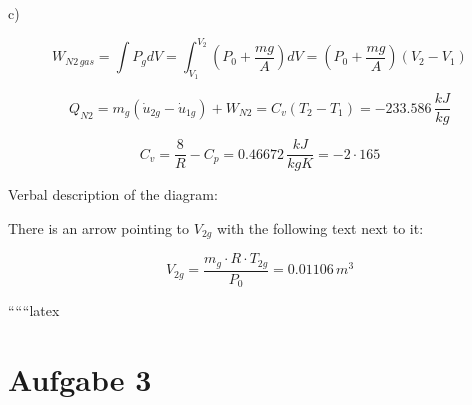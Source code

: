 c) 

\[
W_{N2 \, gas} = \int P_g dV = \int_{V_1}^{V_2} \left( P_0 + \frac{mg}{A} \right) dV = (P_0 + \frac{mg}{A})(V_2 - V_1)
\]

\[
Q_{N2} = m_g (\dot{u}_{2g} - \dot{u}_{1g}) + W_{N2} = C_v (T_2 - T_1) = -233.586 \, \frac{kJ}{kg}
\]

\[
C_v = \frac{8}{R} - C_p = 0.46672 \, \frac{kJ}{kgK} = -2 \cdot 165
\]

\noindent
Verbal description of the diagram:

There is an arrow pointing to \( V_{2g} \) with the following text next to it:

\[
V_{2g} = \frac{m_g \cdot R \cdot T_{2g}}{P_0} = 0.01106 \, m^3
\]

``````latex


\section*{Aufgabe 3}